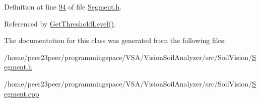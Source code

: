 Definition at line \hyperlink{_segment_8h_source_l00094}{94} of file \hyperlink{_segment_8h_source}{Segment.\+h}.



Referenced by \hyperlink{_segment_8cpp_source_l00069}{Get\+Threshold\+Level()}.



The documentation for this class was generated from the following files\+:\begin{DoxyCompactItemize}
\item 
/home/peer23peer/programmingspace/\+V\+S\+A/\+Vision\+Soil\+Analyzer/src/\+Soil\+Vision/\hyperlink{_segment_8h}{Segment.\+h}\item 
/home/peer23peer/programmingspace/\+V\+S\+A/\+Vision\+Soil\+Analyzer/src/\+Soil\+Vision/\hyperlink{_segment_8cpp}{Segment.\+cpp}\end{DoxyCompactItemize}
